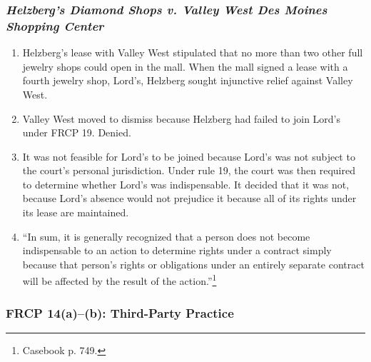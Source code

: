 \subsubsection{\emph{Helzberg's Diamond Shops v. Valley West Des Moines 
Shopping Center}}

\begin{enumerate}
    \item Helzberg's lease with Valley West stipulated that no more than two 
    other full jewelry shops could open in the mall. When the mall signed a 
    lease with a fourth jewelry shop, Lord's, Helzberg sought injunctive 
    relief against Valley West.
    \item Valley West moved to dismiss because Helzberg had failed to join 
    Lord's under FRCP 19. Denied.
    \item It was not feasible for Lord's to be joined because Lord's was not 
    subject to the court's personal jurisdiction. Under rule 19, the court was 
    then required to determine whether Lord's was indispensable. It decided 
    that it was not, because Lord's absence would not prejudice it because all 
    of its rights under its lease are maintained.
    \item ``In sum, it is generally recognized that a person does not become 
    indispensable to an action to determine rights under a contract simply 
    because that person's rights or obligations under an entirely separate 
    contract will be affected by the result of the action.''\footnote{Casebook 
    p. 749.}
\end{enumerate}

\subsubsection{FRCP 14(a)--(b): Third-Party Practice}

